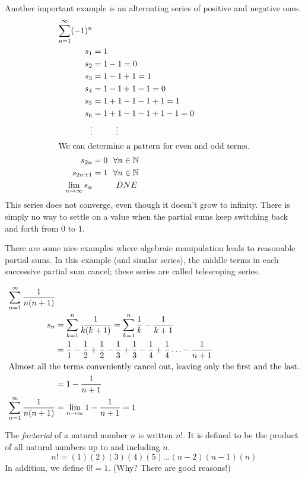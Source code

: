 \documentclass[fleqn]{report}
\begin{document}
\begin{example}Another important example is an alternating
series of positive and negative ones.
\begin{align*}
\sum_{n=1}^\infty (-1)^n & \\
s_1 & = 1 \\
s_2 & = 1-1 = 0 \\
s_3 & = 1-1+1 = 1\\
s_4 & = 1-1+1-1 = 0 \\
s_5 & = 1+1-1-1+1 = 1\\
s_6 & = 1+1-1-1+1-1 = 0 \\
\vdots & \hspace{1cm} \vdots \\
\intertext{We can determine a pattern for even and odd terms.}
s_{2n} & = 0 \ \ \forall n \in \mathbb{N}\\
s_{2n+1} & = 1 \ \ \forall n \in \mathbb{N} \\
\lim_{n \rightarrow \infty} s_n & \hspace{1cm} DNE
\end{align*}
This series does not converge, even though it doesn't grow to
infinity. There is simply no way to settle on a value when the
partial sums keep switching back and forth from $0$ to $1$. 
\end{example}

\begin{example}There are some nice examples where algebraic
manipulation leads to reasonable partial sums. In this example (and
similar series), the middle terms in each successive partial sum
cancel; these series are called telescoping series.

\begin{align*}
\sum_{n=1}^\infty \frac{1}{n(n+1)} & \\
s_n & = \sum_{k=1}^n \frac{1}{k(k+1)} = \sum_{k=1}^n \frac{1}{k} -
\frac{1}{k+1} \\
& = \frac{1}{1} - \frac{1}{2} + \frac{1}{2} - \frac{1}{3} +
\frac{1}{3} - \frac{1}{4} + \frac{1}{4} \ldots - \frac{1}{n+1}
\\
\intertext{Almost all the terms conveniently cancel out,
leaving only the first and the last.}
& = 1 - \frac{1}{n+1} \\
\sum_{n=1}^\infty \frac{1}{n(n+1)} & = \lim_{n \rightarrow
\infty} 1 - \frac{1}{n+1} = 1 
\end{align*}
\end{example}

\begin{defn}
The \emph{factorial} of a natural number $n$ is written $n!$.
It is defined to be the product of all natural numbers up to
and including $n$.
\begin{equation*}
n! = (1)(2)(3)(4)(5)\ldots(n-2)(n-1)(n)
\end{equation*}
In addition, we define $0! = 1$. (Why? There are good
reasons!) 
\end{defn}
\end{document}
